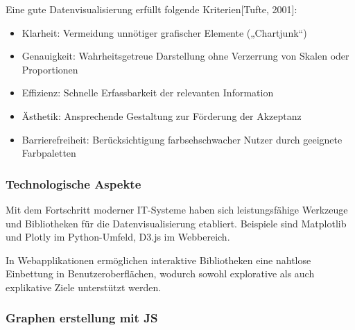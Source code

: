 Eine gute Datenvisualisierung erfüllt folgende Kriterien[Tufte, 2001]:


\begin{itemize}

\item
Klarheit: Vermeidung unnötiger grafischer Elemente („Chartjunk“)
\item
Genauigkeit: Wahrheitsgetreue Darstellung ohne Verzerrung von Skalen oder Proportionen
\item
Effizienz: Schnelle Erfassbarkeit der relevanten Information
\item
Ästhetik: Ansprechende Gestaltung zur Förderung der Akzeptanz
\item
Barrierefreiheit: Berücksichtigung farbsehschwacher Nutzer durch geeignete Farbpaletten

\end{itemize}

\subsubsection{Technologische Aspekte}

Mit dem Fortschritt moderner IT-Systeme haben sich leistungsfähige Werkzeuge und Bibliotheken für die
Datenvisualisierung etabliert.
Beispiele sind Matplotlib und Plotly im Python-Umfeld, D3.js im Webbereich.

In Webapplikationen ermöglichen interaktive Bibliotheken eine nahtlose Einbettung in Benutzeroberflächen,
wodurch sowohl explorative als auch explikative Ziele unterstützt werden.

\pagebreak

\subsubsection{Graphen erstellung mit JS}